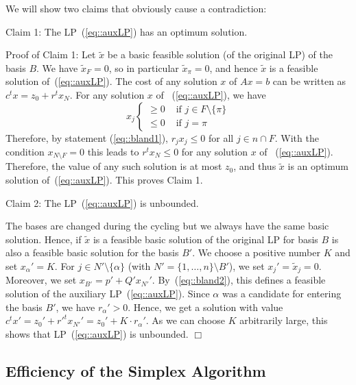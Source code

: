 \documentclass[12pt, showidx, twoside]{article}
\def\endproof{\hfill{$\Box$}}
\begin{document}
{{{We will show two claims that obviously cause a contradiction:

Claim 1: The LP~(\ref{eq::auxLP}) has an optimum solution.

Proof of Claim 1: Let $\tilde x$ be a basic feasible solution (of the original LP)
of the basis $B$. We have $\tilde x_F = 0$, so in particular $\tilde x_\pi = 0$, and hence
$\tilde x$ is a feasible solution of~(\ref{eq::auxLP}).
The cost of any solution $x$ of $Ax=b$ can be written as $c^t x = z_0 + r^t x_N$.
For any solution $x$ of ~(\ref{eq::auxLP}), we have
\[
   x_{j}    \left\{ \begin{array}{ll}
                              \geq 0 & \mbox{ if } j \in F \setminus\{\pi\}\\
                              \leq 0 & \mbox{ if } j = \pi
                  \end{array}
          \right.
\]
Therefore, by statement (\ref{eq::bland1}),
$r_j x_{j} \leq 0$ for all $j \in n \cap F$.
With the condition $x_{N \setminus F}=0$ this leads to $r^t x_N\leq 0$ for any
solution $x$ of ~(\ref{eq::auxLP}). Therefore, the value of any such solution
is at most $z_0$, and 
thus $\tilde x$ is an optimum solution of~(\ref{eq::auxLP}). This proves Claim 1.

Claim 2: The LP~(\ref{eq::auxLP}) is unbounded.

The bases are changed during the cycling but we always have the same basic solution.
Hence, if $\tilde x$ is a feasible basic solution of the original LP for basis $B$
is also a feasible basic solution for
the basis $B'$. We choose a positive number $K$ and set 
$x_{\alpha}' = K$. For $j \in N' \setminus \{\alpha\}$ (with 
$N' = \{1,\dots,n\}\setminus B'$), we set $x_j' = \tilde x_j = 0$.
Moreover, we set $x_{B'} = p' + Q' x_{N'}'$. 
By~(\ref{eq::bland2}), this defines a feasible solution of the auxiliary
LP~(\ref{eq::auxLP}).
Since $\alpha$ was a candidate for entering the basis $B'$, we have $r_{\alpha}' > 0$.
Hence, we get a solution with value $c^t x' = z_0' + r'^t x_{N'}' = z_0' + K \cdot r_{\alpha}'$.
As we can choose $K$ arbitrarily large, this shows that LP~(\ref{eq::auxLP}) is unbounded.
\endproof


\subsection{Efficiency of the Simplex Algorithm}

}}}
\end{document}
